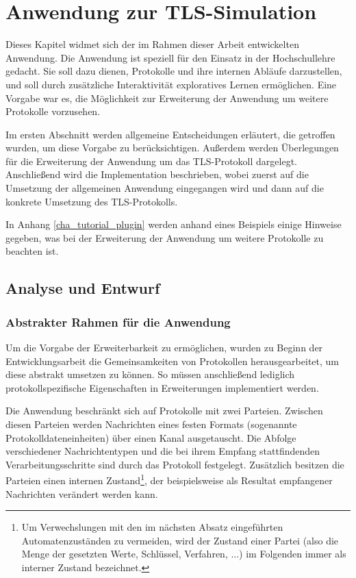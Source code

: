 \chapter{Anwendung zur TLS-Simulation}
\label{cha_implementation}

Dieses Kapitel widmet sich der im Rahmen dieser Arbeit entwickelten Anwendung. 
Die Anwendung ist speziell für den Einsatz in der Hochschullehre gedacht. Sie soll dazu dienen, Protokolle und ihre internen Abläufe darzustellen, und soll durch zusätzliche Interaktivität exploratives Lernen ermöglichen. Eine Vorgabe war es, die Möglichkeit zur Erweiterung der Anwendung um weitere Protokolle vorzusehen. 

Im ersten Abschnitt werden allgemeine Entscheidungen erläutert, die getroffen wurden, um diese Vorgabe zu berücksichtigen. Außerdem werden Überlegungen für die Erweiterung der Anwendung um das TLS-Protokoll dargelegt.\\
Anschließend wird die Implementation beschrieben, wobei zuerst auf die Umsetzung der allgemeinen Anwendung eingegangen wird und dann auf die konkrete Umsetzung des TLS-Protokolls.

In Anhang \ref{cha_tutorial_plugin} werden anhand eines Beispiels einige Hinweise gegeben, was bei der Erweiterung der Anwendung um weitere Protokolle zu beachten ist.

\section{Analyse und Entwurf}

\subsection{Abstrakter Rahmen für die Anwendung}

Um die Vorgabe der Erweiterbarkeit zu ermöglichen, wurden zu Beginn der Entwicklungsarbeit die Gemeinsamkeiten von Protokollen herausgearbeitet, um diese abstrakt umsetzen zu können. So müssen anschließend lediglich protokollspezifische Eigenschaften in Erweiterungen implementiert werden.

Die Anwendung beschränkt sich auf Protokolle mit zwei Parteien. Zwischen diesen Parteien werden Nachrichten eines festen Formats (sogenannte Protokolldateneinheiten) über einen Kanal ausgetauscht. Die Abfolge verschiedener Nachrichtentypen und die bei ihrem Empfang stattfindenden Verarbeitungsschritte sind durch das Protokoll festgelegt. Zusätzlich besitzen die Parteien einen internen Zustand\footnote{
	Um Verwechslungen mit den im nächsten Absatz eingeführten Automatenzuständen zu vermeiden, wird der Zustand einer Partei (also die Menge der gesetzten Werte, Schlüssel, Verfahren, ...) im Folgenden immer als interner Zustand bezeichnet.
}, der beispielsweise als Resultat empfangener Nachrichten verändert werden kann. 

